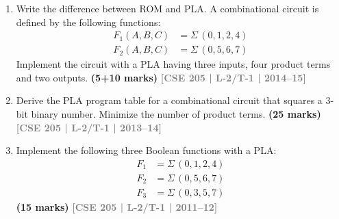 \documentclass[12pt]{article}
\newcommand{\yr}[1]{\hfill\textcolor{gray}{\small\textbf{[#1]}}}
\newcommand{\mk}[1]{\textcolor{orange!70!black}{\small\textbf{(#1 marks)}}}
\begin{document}
\begin{enumerate}
\begin{center}

\end{center}

\mk{13} \yr{CSE 205 | L-2/T-1 | 2015--16}



\item Write the difference between ROM and PLA. A combinational circuit is defined by the following functions:
\begin{align*}
  F_1(A,B,C) &= \Sigma\,(0,1,2,4) \\
  F_2(A,B,C) &= \Sigma\,(0,5,6,7)
\end{align*}
Implement the circuit with a PLA having three inputs, four product terms and two outputs.
\mk{5+10} \yr{CSE 205 | L-2/T-1 | 2014--15}



\item Derive the PLA program table for a combinational circuit that squares a 3-bit binary number. Minimize the number of product terms.
\mk{25} \yr{CSE 205 | L-2/T-1 | 2013--14}



\item Implement the following three Boolean functions with a PLA:
\begin{align*}
  F_1 &= \Sigma\,(0,1,2,4) \\
  F_2 &= \Sigma\,(0,5,6,7) \\
  F_3 &= \Sigma\,(0,3,5,7)
\end{align*}
\mk{15} \yr{CSE 205 | L-2/T-1 | 2011--12}



\end{enumerate}
\end{document}
